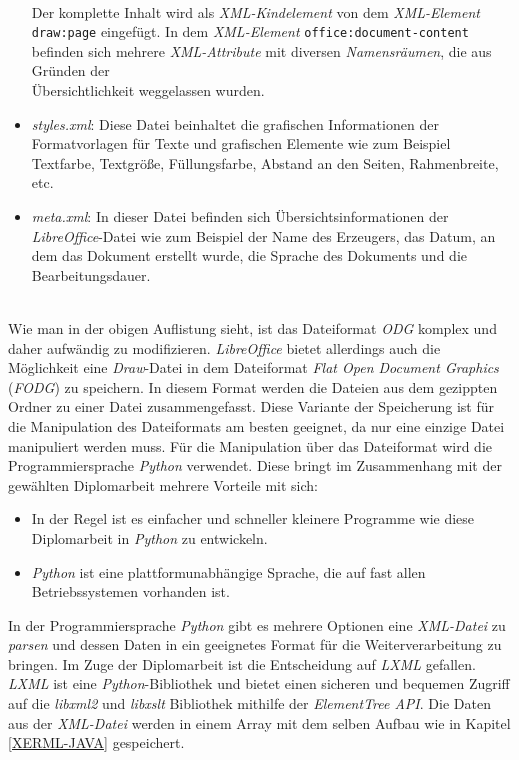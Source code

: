 \begin{itemize}
	\noindent
	\hon{}
	\\
	\noindent
	Der komplette Inhalt wird als \textit{XML-Kindelement} von dem \textit{XML-Element} \verb|draw:page| eingefügt.
	In dem \textit{XML-Element} \verb|office:document-content| befinden sich mehrere \textit{XML-Attribute} mit diversen \textit{Namensräumen}, die aus Gründen der \\ Übersichtlichkeit weggelassen wurden.
	
	\item \textit{styles.xml}: Diese Datei beinhaltet die grafischen Informationen der Formatvorlagen für Texte und grafischen Elemente wie zum Beispiel Textfarbe, Textgröße, Füllungsfarbe, Abstand an den Seiten, Rahmenbreite, etc. 
	\item \textit{meta.xml}: In dieser Datei befinden sich Übersichtsinformationen der \textit{LibreOffice}-Datei wie zum Beispiel der Name des Erzeugers, das Datum, an dem das Dokument erstellt wurde, die Sprache des Dokuments und die Bearbeitungsdauer.
	
\end{itemize}
\noindent
\hon{}
\\
\noindent
Wie man in der obigen Auflistung sieht, ist das Dateiformat \textit{ODG} komplex und daher aufwändig zu modifizieren.
\textit{LibreOffice} bietet allerdings auch die Möglichkeit eine \textit{Draw}-Datei in dem Dateiformat \textit{Flat Open Document Graphics} (\textit{FODG}) zu speichern. In diesem Format werden die Dateien aus dem gezippten Ordner zu einer Datei zusammengefasst. Diese Variante der Speicherung ist für die Manipulation des Dateiformats am besten geeignet, da nur eine einzige Datei manipuliert werden muss. 
Für die Manipulation über das Dateiformat wird die Programmiersprache \textit{Python} verwendet. Diese bringt im Zusammenhang mit der gewählten Diplomarbeit mehrere Vorteile mit sich:
\begin{itemize}
	\item In der Regel ist es einfacher und schneller kleinere Programme wie diese Diplomarbeit in \textit{Python} zu entwickeln.
	\item \textit{Python} ist eine plattformunabhängige Sprache, die auf fast allen Betriebssystemen vorhanden ist. 
\end{itemize}

\hon{}

\noindent
In der Programmiersprache \textit{Python} gibt es mehrere Optionen eine \textit{XML-Datei} zu \textit{parsen} und dessen Daten in ein geeignetes Format für die Weiterverarbeitung zu bringen. Im Zuge der Diplomarbeit ist die Entscheidung auf \textit{LXML} gefallen. \textit{LXML} ist eine \textit{Python}-Bibliothek und bietet einen sicheren und bequemen Zugriff auf die \textit{libxml2} und \textit{libxslt} Bibliothek mithilfe der \textit{ElementTree API}. Die Daten aus der \textit{XML-Datei} werden in einem Array mit dem selben Aufbau wie in Kapitel \ref{XERML-JAVA} gespeichert.


